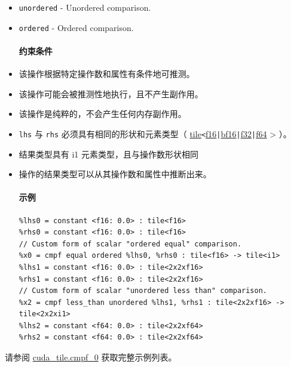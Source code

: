\documentclass{article}
\begin{document}
\begin{itemize}
\item \texttt{unordered} - Unordered comparison.
\item \texttt{ordered} - Ordered comparison.


\paragraph{约束条件}

\item 该操作根据特定操作数和属性有条件地可推测。
\item 该操作可能会被推测性地执行，且不产生副作用。
\item 该操作是纯粹的，不会产生任何内存副作用。
\item \texttt{lhs} 与 \texttt{rhs} 必须具有相同的形状和元素类型（ \href{https://docs.nvidia.com/cuda/tile-ir/latest/sections/types.html#type-tile}{tile}\texttt{<}\href{https://docs.nvidia.com/cuda/tile-ir/latest/sections/types.html#subsection-element-types}{f16}\texttt{|}\href{https://docs.nvidia.com/cuda/tile-ir/latest/sections/types.html#subsection-element-types}{bf16}\texttt{|}\href{https://docs.nvidia.com/cuda/tile-ir/latest/sections/types.html#subsection-element-types}{f32}\texttt{|}\href{https://docs.nvidia.com/cuda/tile-ir/latest/sections/types.html#subsection-element-types}{f64} > ）。
\item 结果类型具有 i1 元素类型，且与操作数形状相同
\item 操作的结果类型可以从其操作数和属性中推断出来。


\paragraph{示例}

\begin{lstlisting}
%lhs0 = constant <f16: 0.0> : tile<f16>
%rhs0 = constant <f16: 0.0> : tile<f16>
// Custom form of scalar "ordered equal" comparison.
%x0 = cmpf equal ordered %lhs0, %rhs0 : tile<f16> -> tile<i1>
%lhs1 = constant <f16: 0.0> : tile<2x2xf16>
%rhs1 = constant <f16: 0.0> : tile<2x2xf16>
// Custom form of scalar "unordered less than" comparison.
%x2 = cmpf less_than unordered %lhs1, %rhs1 : tile<2x2xf16> -> tile<2x2xi1>
%lhs2 = constant <f64: 0.0> : tile<2x2xf64>
%rhs2 = constant <f64: 0.0> : tile<2x2xf64>
\end{lstlisting}

\end{itemize}
请参阅 \href{https://docs.nvidia.com/cuda/tile-ir/latest/sections/appendix.html#example-cuda-tile-cmpf-0}{cuda\_tile.cmpf\_0} 获取完整示例列表。
\end{document}
